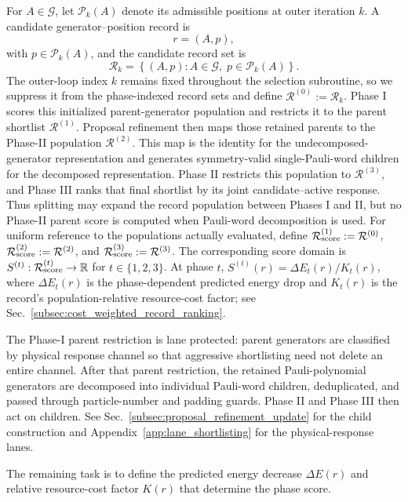 \documentclass[
  reprint,
  amsmath,
  amssymb,
  aps,
  pra,
  nofootinbib,
  superscriptaddress,
  floatfix
]{revtex4-2}
\begin{document}
For \(A\in\mathcal G\), let \(\mathcal P_k(A)\) denote its admissible positions
at outer iteration \(k\). A candidate generator--position record is
\[
r=(A,p),
\]
with \(p\in\mathcal P_k(A)\), and the candidate record set is
\begin{equation}
\mathcal R_k
=
\left\{
(A,p):
A\in\mathcal G,\;
p\in\mathcal P_k(A)
\right\}.
\label{record_set}
\end{equation}
The outer-loop index \(k\) remains fixed throughout the selection subroutine,
so we suppress it from the phase-indexed record sets and define
\(\mathcal R^{(0)}:=\mathcal R_k\). Phase I scores this initialized
parent-generator population and restricts it to the parent shortlist
\(\mathcal R^{(1)}\). Proposal refinement then maps those retained parents to
the Phase-II population \(\mathcal R^{(2)}\). This map is the identity for the
undecomposed-generator representation and generates symmetry-valid
single-Pauli-word children for the decomposed representation. Phase II
restricts this population to \(\mathcal R^{(3)}\), and Phase III ranks that final shortlist by its joint
candidate--active response. Thus splitting may expand the record population
between Phases I and II, but no Phase-II parent score is computed when
Pauli-word decomposition is used. For uniform reference to the populations
actually evaluated, define
\(\mathcal R_{\rm score}^{(1)}:=\mathcal R^{(0)}\),
\(\mathcal R_{\rm score}^{(2)}:=\mathcal R^{(2)}\), and
\(\mathcal R_{\rm score}^{(3)}:=\mathcal R^{(3)}\). The corresponding score
domain is \(S^{(t)}:\mathcal R_{\rm score}^{(t)}\to\mathbb R\) for
\(t\in\{1,2,3\}\). At phase \(t\),
\(S^{(t)}(r)=\Delta E_t(r)/K_t(r)\), where \(\Delta E_t(r)\) is the
phase-dependent predicted energy drop and \(K_t(r)\) is the record's
population-relative resource-cost factor; see
Sec.~\ref{subsec:cost_weighted_record_ranking}.

The Phase-I parent restriction is lane protected: parent generators are classified
by physical response channel so that aggressive shortlisting need not delete an
entire channel. After that parent restriction, the retained Pauli-polynomial
generators are decomposed into individual Pauli-word children, deduplicated, and
passed through particle-number and padding guards. Phase II and Phase III then
act on children. See Sec.~\ref{subsec:proposal_refinement_update} for the child
construction and Appendix~\ref{app:lane_shortlisting} for the physical-response
lanes.

The remaining task is to define the predicted energy decrease \(\Delta E(r)\) and relative resource-cost factor \(K(r)\) that determine the phase score.
\end{document}
